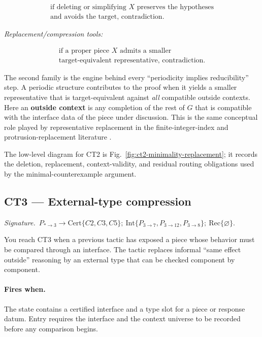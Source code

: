 \documentclass[
  11pt,
]{article}
\theoremstyle{definition}
\newcommand{\ctsignature}[1]{\par\noindent\emph{Signature.}\ #1\par\medskip}
\newcommand{\ctcert}[1]{\mathrm{Cert}\{#1\}}
\newcommand{\ctint}[1]{\mathrm{Int}\{#1\}}
\newcommand{\ctrec}[1]{\mathrm{Rec}\{#1\}}
\newcommand{\ctnone}{\varnothing}
\newcommand{\ctpar}[1]{\paragraph{#1.}}
\begin{document}
\[
\begin{gathered}
\text{if deleting or simplifying } X \text{ preserves the hypotheses}\\
\text{and avoids the target, contradiction.}
\end{gathered}
\]

\emph{Replacement/compression tools:}

\[
\begin{gathered}
\text{if a proper piece } X \text{ admits a smaller}\\
\text{target-equivalent representative, contradiction.}
\end{gathered}
\]

The second family is the engine behind every ``periodicity implies
reducibility'' step. A periodic structure contributes to the proof when
it yields a smaller representative that is target-equivalent against
\emph{all} compatible outside contexts. Here an \textbf{outside context}
is any completion of the rest of \(G\) that is compatible with the
interface data of the piece under discussion. This is the same
conceptual role played by representative replacement in the
finite-integer-index and protrusion-replacement literature
\citep{bodlaender-etal-2009-meta-kernelization, kim-etal-2012-protrusion, garnero-etal-2013-explicit-kernels, jansen-wulms-2016-lower-bounds}.

The low-level diagram for CT2 is Fig.~\ref{fig:ct2-minimality-replacement};
it records the deletion, replacement, context-validity, and residual
routing obligations used by the minimal-counterexample argument.



\subsection{CT3 --- External-type compression}\label{ct:3}\label{boundaried-pieces-and-external-types}
\ctsignature{\(P_{\ast\to3}\to \ctcert{C2,C3,C5};\ \ctint{P_{3\to7},P_{3\to12},P_{3\to8}};\ \ctrec{\ctnone}\).}

You reach CT3 when a previous tactic has exposed a piece whose behavior
must be compared through an interface.  The tactic replaces informal
``same effect outside'' reasoning by an external type that can be
checked component by component.

\ctpar{Fires when}
The state contains a certified interface and a type slot for a piece or
response datum.  Entry requires the interface and the context universe to
be recorded before any comparison begins.
\end{document}
